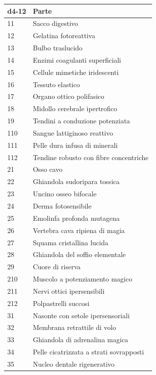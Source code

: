 \begin{multicols}{2}
\noindent\begin{tabularx}{\linewidth}{lX}
	\toprule
 \rowcolor{gray!20}\textbf{d4-12}&\textbf{Parte}\\
	\toprule
	11 & Sacco digestivo \\
 \rowcolor{gray!20}12 & Gelatina fotoreattiva \\
	13 & Bulbo traslucido \\
 \rowcolor{gray!20}14 & Enzimi coagulanti superficiali \\
	15 & Cellule mimetiche iridescenti \\
 \rowcolor{gray!20}16 & Tessuto elastico \\
	17 & Organo ottico polifasico \\
 \rowcolor{gray!20}18 & Midollo cerebrale ipertrofico \\
	19 & Tendini a conduzione potenziata \\
 \rowcolor{gray!20}110 & Sangue lattiginoso reattivo \\
	111 & Pelle dura infusa di minerali \\
 \rowcolor{gray!20}112 & Tendine robusto con fibre concentriche \\
	21 & Osso cavo \\
 \rowcolor{gray!20}22 & Ghiandola sudoripara tossica \\
	23 & Uncino osseo bifocale \\
 \rowcolor{gray!20}24 & Derma fotosensibile \\
	25 & Emolinfa profonda mutagena \\
 \rowcolor{gray!20}26 & Vertebra cava ripiena di magia \\
	27 & Squama cristallina lucida \\
 \rowcolor{gray!20}28 & Ghiandola del soffio elementale \\
	29 & Cuore di riserva \\
 \rowcolor{gray!20}210 & Muscolo a potenziamento magico \\
	211 & Nervi ottici ipersensibili \\
 \rowcolor{gray!20}212 & Polpastrelli succosi\\
	31 & Nasonte con setole ipersensoriali \\
 \rowcolor{gray!20}32 & Membrana retrattile di volo \\
	33 & Ghiandola di adrenalina magica \\
 \rowcolor{gray!20}34 & Pelle cicatrizzata a strati sovrapposti \\
	35 & Nucleo dentale rigenerativo \\

\end{tabularx}
\end{multicols}
